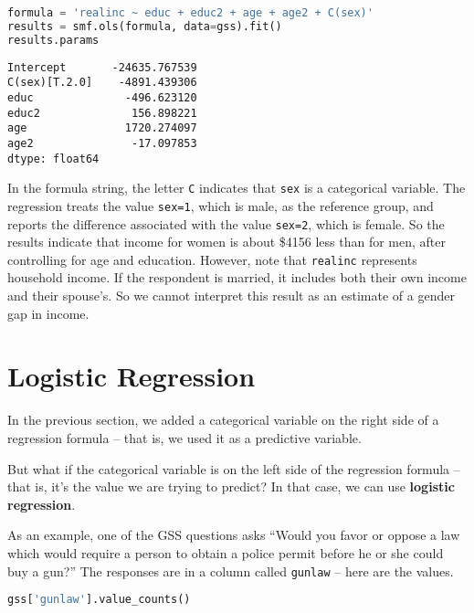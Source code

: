 \begin{lstlisting}[language=Python,style=source]
formula = 'realinc ~ educ + educ2 + age + age2 + C(sex)'
results = smf.ols(formula, data=gss).fit()
results.params
\end{lstlisting}

\begin{lstlisting}[style=output]
Intercept       -24635.767539
C(sex)[T.2.0]    -4891.439306
educ              -496.623120
educ2              156.898221
age               1720.274097
age2               -17.097853
dtype: float64
\end{lstlisting}

In the formula string, the letter \passthrough{\lstinline!C!} indicates
that \passthrough{\lstinline!sex!} is a categorical variable. The
regression treats the value \passthrough{\lstinline!sex=1!}, which is
male, as the reference group, and reports the difference associated with
the value \passthrough{\lstinline!sex=2!}, which is female. So the
results indicate that income for women is about \$4156 less than for
men, after controlling for age and education. However, note that
\passthrough{\lstinline!realinc!} represents household income. If the
respondent is married, it includes both their own income and their
spouse's. So we cannot interpret this result as an estimate of a gender
gap in income.

\section{Logistic Regression}\label{logistic-regression}

In the previous section, we added a categorical variable on the right
side of a regression formula -- that is, we used it as a predictive
variable.

But what if the categorical variable is on the left side of the
regression formula -- that is, it's the value we are trying to predict?
In that case, we can use \textbf{logistic regression}.

As an example, one of the GSS questions asks ``Would you favor or oppose
a law which would require a person to obtain a police permit before he
or she could buy a gun?'' The responses are in a column called
\passthrough{\lstinline!gunlaw!} -- here are the values.

\begin{lstlisting}[language=Python,style=source]
gss['gunlaw'].value_counts()
\end{lstlisting}


